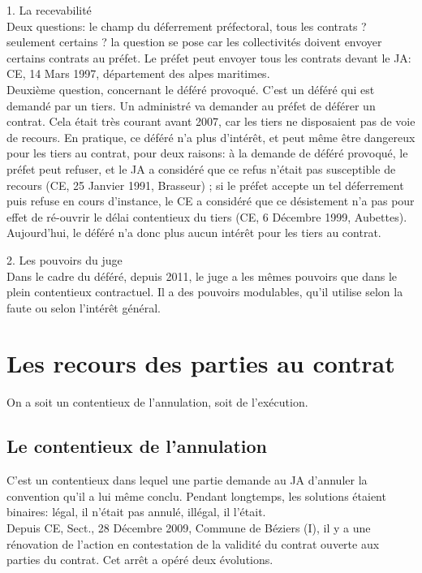 \documentclass[10pt, a4paper, openany]{book}
\begin{document}
1. La recevabilité \\
Deux questions: le champ du déferrement préfectoral, tous les contrats ? seulement certains ? la question se pose car les collectivités doivent envoyer certains contrats au préfet. Le préfet peut envoyer tous les contrats devant le JA: CE, 14 Mars 1997, département des alpes maritimes. \\
Deuxième question, concernant le déféré provoqué. C'est un déféré qui est demandé par un tiers. Un administré va demander au préfet de déférer un contrat. Cela était très courant avant 2007, car les tiers ne disposaient pas de voie de recours. En pratique, ce déféré n'a plus d'intérêt, et peut même être dangereux pour les tiers au contrat, pour deux raisons: à la demande de déféré provoqué, le préfet peut refuser, et le JA a considéré que ce refus n'était pas susceptible de recours (CE, 25 Janvier 1991, Brasseur) ; si le préfet accepte un tel déferrement puis refuse en cours d'instance, le CE a considéré que ce désistement n'a pas pour effet de ré-ouvrir le délai contentieux du tiers (CE, 6 Décembre 1999, Aubettes). \\
Aujourd'hui, le déféré n'a donc plus aucun intérêt pour les tiers au contrat. 


2. Les pouvoirs du juge \\
Dans le cadre du déféré, depuis 2011, le juge a les mêmes pouvoirs que dans le plein contentieux contractuel. Il a des pouvoirs modulables, qu'il utilise selon la faute ou selon l'intérêt général.


\section{Les recours des parties au contrat}

On a soit un contentieux de l'annulation, soit de l'exécution.

\subsection{Le contentieux de l'annulation}

C'est un contentieux dans lequel une partie demande au JA d'annuler la convention qu'il a lui même conclu. Pendant longtemps, les solutions étaient binaires: légal, il n'était pas annulé, illégal, il l'était. \\
Depuis CE, Sect., 28 Décembre 2009, Commune de Béziers (I), il y a une rénovation de l'action en contestation de la validité du contrat ouverte aux parties du contrat. Cet arrêt a opéré deux évolutions.
\end{document}
